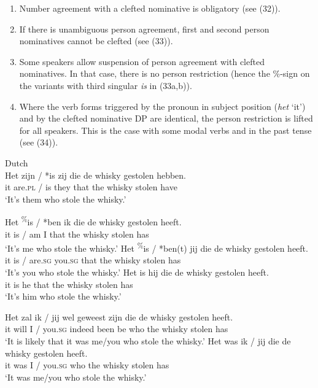 \documentclass[output=paper]{langsci/langscibook}
\begin{document}
\begin{enumerate}[label=(\roman*)]
\item  Number agreement with a clefted nominative is obligatory (see (32)). 
\item  If there is unambiguous person agreement, first and second person nominatives cannot be clefted (see (33)). 
\item Some speakers allow suspension of person agreement with clefted nominatives. In that case, there is no person restriction (hence the \%-sign on the variants with third singular \textit{is} in (33a,b)). 
\item  Where the verb forms triggered by the pronoun in subject position (\textit{het} ‘it’) and by the clefted nominative DP are identical, the person restriction is lifted for all speakers. This is the case with some modal verbs and in the past tense (see (34)).
\end{enumerate}

\ea \label{bkm:Ref295486016}  Dutch\\
 \gll Het zijn / *is   zij   die   de whisky gestolen hebben.\\
    it    are.\textsc{pl} / is they that the whisky stolen     have\\
\glt   ‘It’s them who stole the whisky.’  
\z

\ea \label{bkm:Ref295486091}  
\ea \gll Het \textsuperscript{\%}is / *ben ik die  de  whisky gestolen heeft.\\
    it       is / am    I  that the whisky stolen      has\\
\glt    ‘It’s me who stole the whisky.’
\ex 
\gll Het \textsuperscript{\%}is / *ben(t) jij         die  de  whisky gestolen heeft.\\
    it      is / are.\textsc{sg}   you.\textsc{sg} that the whisky stolen      has\\
\glt    ‘It’s you who stole the whisky.’
\ex 
\gll Het is hij die  de  whisky gestolen heeft.\\
    it     is he that the whisky stolen     has\\
\glt  ‘It’s him who stole the whisky.’
\z
\z


\ea \label{bkm:Ref295486338}  
\ea \gll Het zal  ik / jij      wel      geweest zijn die  de  whisky gestolen heeft.\\
    it    will I / you.\textsc{sg} indeed been      be   who the whisky stolen     has\\
\glt    ‘It is likely that it was me/you who stole the whisky.’
\ex \gll  Het was ik / jij        die  de  whisky gestolen heeft.\\
    it     was I / you.\textsc{sg} who the whisky stolen      has\\
\glt  ‘It was me/you who stole the whisky.’
\z
\z
\end{document}
